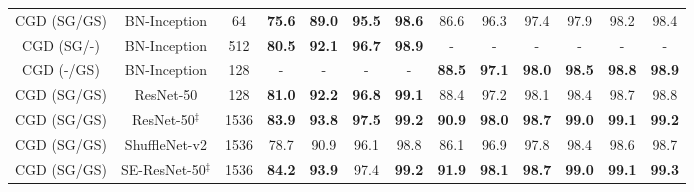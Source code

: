 \documentclass[10pt,twocolumn,letterpaper]{article}
\begin{document}
\begin{CJK}{UTF8}{mj}
\begin{table*}[h!t]
\begin{center}
{\begin{adjustbox}{width=0.85\textwidth,center}
\begin{tabular}{c|c|c|cccc|cccccc}
    CGD (SG/GS)             & \color{Plum}BN-Inception               & \color{Plum}64                   & {\color{Plum}\textbf{75.6}} & {\color{Plum}\textbf{89.0}} & {\color{Plum}\textbf{95.5}} & {\color{Plum}\textbf{98.6}} & 86.6 & 96.3 & 97.4 & 97.9 & 98.2 & 98.4 \\
    CGD (SG/\space\space-\space\space)& \color{OliveGreen}BN-Inception     & \color{OliveGreen}512                  & {\color{OliveGreen}\textbf{80.5}} & {\color{OliveGreen}\textbf{92.1}} & {\color{OliveGreen}\textbf{96.7}} & {\color{OliveGreen}\textbf{98.9}} & -    & -    & -    & -    & -    & -    \\
    CGD (\space\space-\space\space/GS)& \color{OliveGreen}BN-Inception     & \color{OliveGreen}128                  & -    & -    & -    & -    & {\color{OliveGreen}\textbf{88.5}} & {\color{OliveGreen}\textbf{97.1}} & {\color{OliveGreen}\textbf{98.0}} & {\color{OliveGreen}\textbf{98.5}} & {\color{OliveGreen}\textbf{98.8}} & {\color{OliveGreen}\textbf{98.9}}   \\
    CGD (SG/GS)             & \color{blue}ResNet-50                  & \color{blue}128                  & {\color{blue}\textbf{81.0}} & {\color{blue}\textbf{92.2}} & {\color{blue}\textbf{96.8}} & {\color{blue}\textbf{99.1}} & 88.4 & 97.2 & 98.1 & 98.4 & 98.7 & 98.8 \\
    CGD (SG/GS)             & \color{red}ResNet-50$^\ddagger$         & \color{red}1536                 & {\color{red}\textbf{83.9}} & {\color{red}\textbf{93.8}} & {\color{red}\textbf{97.5}} & {\color{red}\textbf{99.2}} & {\color{red}\textbf{90.9}} & {\color{red}\textbf{98.0}} & {\color{red}\textbf{98.7}} & {\color{red}\textbf{99.0}} & {\color{red}\textbf{99.1}} & {\color{red}\textbf{99.2}} \\
    CGD (SG/GS)             & ShuffleNet-v2             & 1536                 & 78.7   & 90.9   & 96.1   & 98.8  & 86.1 & 96.9 & 97.8 &  98.4 & 98.6 & 98.7   \\
    CGD (SG/GS)             & SE-ResNet-50$^\ddagger$      & 1536                 & \textbf{84.2} & \textbf{93.9} & 97.4 & \textbf{99.2} & \textbf{91.9} & \textbf{98.1} & \textbf{98.7} & \textbf{99.0} & \textbf{99.1} & \textbf{99.3} \\ \hline
    \end{tabular}
    \end{adjustbox}
    \label{table:sota2}
}


\end{center}
\end{table*}
\end{CJK}
\end{document}
